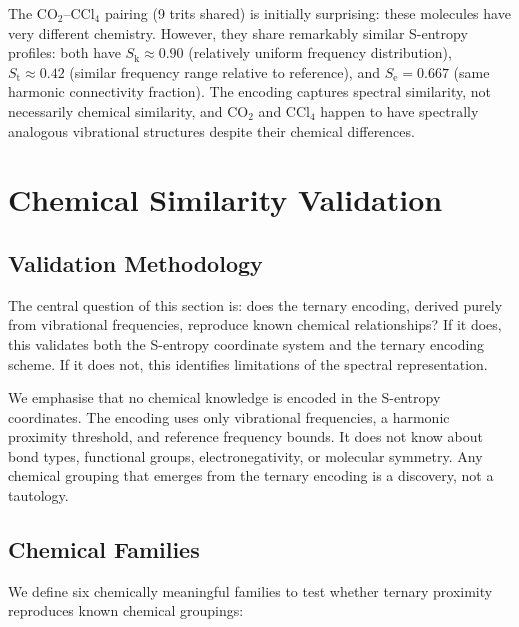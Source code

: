 \documentclass[11pt,twocolumn,a4paper]{article}
\theoremstyle{definition}
\theoremstyle{remark}
\newcommand{\Sk}{S_{\mathrm{k}}}
\newcommand{\St}{S_{\mathrm{t}}}
\newcommand{\Se}{S_{\mathrm{e}}}
\begin{document}
The CO$_2$--CCl$_4$ pairing (9 trits shared) is initially surprising: these molecules have very different chemistry. However, they share remarkably similar S-entropy profiles: both have $\Sk \approx 0.90$ (relatively uniform frequency distribution), $\St \approx 0.42$ (similar frequency range relative to reference), and $\Se = 0.667$ (same harmonic connectivity fraction). The encoding captures spectral similarity, not necessarily chemical similarity, and CO$_2$ and CCl$_4$ happen to have spectrally analogous vibrational structures despite their chemical differences.

\section{Chemical Similarity Validation}
\label{sec:similarity}

\subsection{Validation Methodology}

The central question of this section is: does the ternary encoding, derived purely from vibrational frequencies, reproduce known chemical relationships? If it does, this validates both the S-entropy coordinate system and the ternary encoding scheme. If it does not, this identifies limitations of the spectral representation.

We emphasise that no chemical knowledge is encoded in the S-entropy coordinates. The encoding uses only vibrational frequencies, a harmonic proximity threshold, and reference frequency bounds. It does not know about bond types, functional groups, electronegativity, or molecular symmetry. Any chemical grouping that emerges from the ternary encoding is a discovery, not a tautology.

\subsection{Chemical Families}

We define six chemically meaningful families to test whether ternary proximity reproduces known chemical groupings:
\end{document}
